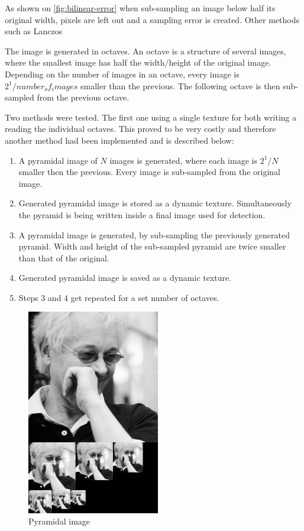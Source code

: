 As shown on \ref{fig:bilinear-error} when sub-sampling an image below half its original width, pixels are left out and a sampling error is created. Other methods such as Lanczos %

The image is generated in octaves. An octave is a structure of several images, where the smallest image has half the width/height of the original image. Depending on the number of images in an octave, every image is $2^1/number_of_images$ smaller than the previous. The following octave is then sub-sampled from the previous octave.

Two methods were tested. The first one using a single texture for both writing a reading the individual octaves. This proved to be very costly and therefore another method had been implemented and is described below:

\begin{enumerate}
	\item A pyramidal image of $N$ images is generated, where each image is $2^1/N$ smaller then the previous. Every image is sub-sampled from the original image.
	\item Generated pyramidal image is stored as a dynamic texture. Simultaneously the pyramid is being written inside a final image used for detection.
	\item A pyramidal image is generated, by sub-sampling the previously generated pyramid. Width and height of the sub-sampled pyramid are twice smaller than that of the original.
	\item Generated pyramidal image is saved as a dynamic texture.
	\item Steps 3 and 4 get repeated for a set number of octaves.
\end{enumerate}

\begin{center}
\begin{figure}[h]
	\centering\includegraphics[height=9cm]{fig/pyramid.jpg}
	\caption{Pyramidal image}
\end{figure}
\end{center}

